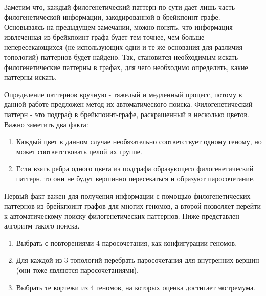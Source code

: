 Заметим что, каждый филогенетический паттерн по сути дает лишь часть филогенетической информации, закодированной в брейкпоинт-графе.
Основываясь на предыдущем замечании, можно понять, что информация извлеченная из брейкпоинт-графа будет тем точнее,
чем больше непересекающихся (не использующих одни и те же основания для различия топологий) паттернов будет найдено.
Так, становится необходимым искать филогенетические паттерны в графах, для чего необходимо определить, какие паттерны искать.

Определение паттернов вручную - тяжелый и медленный процесс, потому в данной работе предложен метод их автоматического поиска.
Филогенетический паттерн - это подграф в брейкпоинт-графе, раскрашенный в несколько цветов.
Важно заметить два факта:
\begin{enumerate}
  \item Каждый цвет в данном случае необязательно соответствует одному геному, но может соответствовать целой их группе.
  \item Если взять ребра одного цвета из подграфа образующего филогенетический паттерн, то они не будут вершинно пересекаться и образуют паросочетание.
\end{enumerate}

Первый факт важен для получения информации с помощью филогенетических паттернов из брейкпоинт-графов для многих геномов,
а второй позволяет перейти к автоматическому поиску филогенетических паттернов.
Ниже представлен алгоритм такого поиска.
\begin{enumerate}
  \item Выбрать с повторениями 4 паросочетания, как конфигурации геномов.
  \item Для каждой из 3 топологий перебрать паросочетания для внутренних вершин (они тоже являются паросочетаниями).
  \item Выбрать те кортежи из 4 геномов, на которых оценка достигает экстремума.
\end{enumerate}

